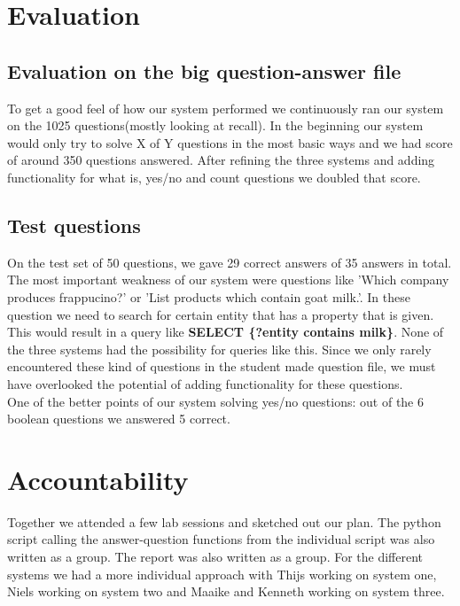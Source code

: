\documentclass{article}
\begin{document}
\section*{Evaluation}
\subsection*{Evaluation on the big question-answer file}
To get a good feel of how our system performed we continuously ran our system on the 1025 questions(mostly looking at recall). In the beginning our system would only try to solve X of Y questions in the most basic ways and we had score of around 350 questions answered. After refining the three systems and adding functionality for what is, yes/no and count questions we doubled that score.
\subsection*{Test questions}
On the test set of 50 questions, we gave 29 correct answers of 35 answers in total. The most important weakness of our system were questions like 'Which company produces frappucino?' or 'List products which contain goat milk.'. In these question we need to search for certain entity that has a property that is given. This would result in a query like \textbf{SELECT \{?entity contains milk\}}. None of the three systems had the possibility for queries like this. Since we only rarely encountered these kind of questions in the student made question file, we must have overlooked the potential of adding functionality for these questions.\\
One of the better points of our system solving yes/no questions: out of the 6 boolean questions we answered 5 correct.

\section*{Accountability}
Together we attended a few lab sessions and sketched out our plan. The python script calling the answer-question functions from the individual script was also written as a group. The report was also written as a group. For the different systems we had a more individual approach with Thijs working on system one, Niels working on system two and Maaike and Kenneth working on system three.
\end{document}
